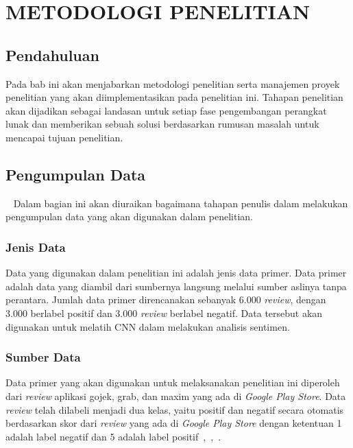\pagestyle{fancy}
\rhead{}
\setcounter{page}{1}
\chapter{METODOLOGI PENELITIAN}

\section{Pendahuluan}
Pada bab ini akan menjabarkan metodologi penelitian serta manajemen proyek penelitian yang akan
diimplementasikan pada penelitian ini. Tahapan penelitian akan dijadikan sebagai landasan untuk
setiap fase pengembangan perangkat lunak dan memberikan sebuah solusi berdasarkan rumusan masalah
untuk mencapai tujuan penelitian.

\section{Pengumpulan Data}~\label{sec:pengumpulan_data}
Dalam bagian ini akan diuraikan bagaimana tahapan penulis dalam melakukan pengumpulan data yang akan
digunakan dalam penelitian.

\subsection{Jenis Data}
Data yang digunakan dalam penelitian ini adalah jenis data primer. Data primer adalah data yang
diambil dari sumbernya langsung melalui sumber aslinya tanpa perantara. Jumlah data primer direncanakan
sebanyak 6.000 \emph{review}, dengan 3.000 berlabel positif dan 3.000 \emph{review} berlabel
negatif. Data tersebut akan digunakan untuk melatih CNN dalam melakukan analisis sentimen.

\subsection{Sumber Data}
Data primer yang akan digunakan untuk melaksanakan penelitian ini diperoleh dari \emph{review}
aplikasi gojek, grab, dan maxim yang ada di \emph{Google Play Store}. Data \emph{review} telah
dilabeli menjadi dua kelas, yaitu positif dan negatif secara otomatis berdasarkan skor dari
\emph{review} yang ada di \emph{Google Play Store} dengan ketentuan 1 adalah label negatif dan 5
adalah label positif~\citep{Akbar2022},~\citep{Smetanin2019},~\citep{Amanatidis2019}.\newpage


\pagestyle{fancy}
\cfoot{}

